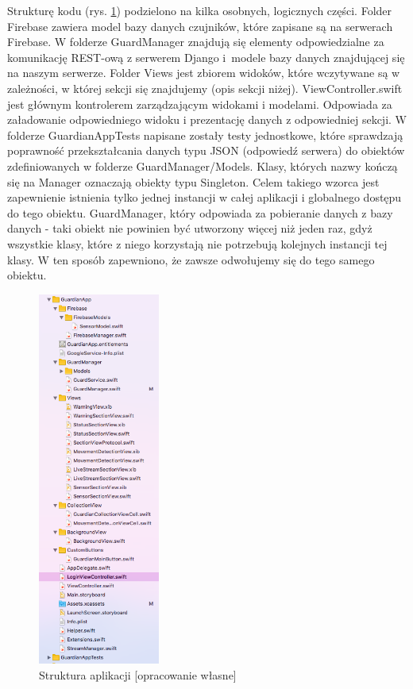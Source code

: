 Strukturę kodu (rys. \ref{iosversion}) podzielono na kilka osobnych, logicznych części. Folder Firebase zawiera model bazy danych czujników, które zapisane są na serwerach Firebase. W folderze GuardManager znajdują się elementy odpowiedzialne za komunikację REST-ową z serwerem Django i~modele bazy danych znajdującej się na naszym serwerze. Folder Views jest zbiorem widoków, które wczytywane są w zależności, w której sekcji się znajdujemy (opis sekcji niżej). ViewController.swift jest głównym kontrolerem zarządzającym widokami i modelami. Odpowiada za załadowanie odpowiedniego widoku i prezentację danych z odpowiedniej sekcji. W folderze GuardianAppTests napisane zostały testy jednostkowe, które sprawdzają poprawność przekształcania danych typu JSON (odpowiedź serwera) do obiektów zdefiniowanych w folderze GuardManager/Models. Klasy, których nazwy kończą się na Manager oznaczają obiekty typu Singleton. Celem takiego wzorca jest zapewnienie istnienia tylko jednej instancji w całej aplikacji i globalnego dostępu do tego obiektu. GuardManager, który odpowiada za pobieranie danych z bazy danych - taki obiekt nie powinien być utworzony więcej niż jeden raz, gdyż wszystkie klasy, które z niego korzystają nie potrzebują kolejnych instancji tej klasy. W ten sposób zapewniono, że zawsze odwołujemy się do tego samego obiektu.
\begin{figure}[H]
	\centering
	\includegraphics[width=4cm]{ios_screenshots/iOSstructure.png}
	\caption{Struktura aplikacji [opracowanie własne]}
	\label{iosversion}
\end{figure}
